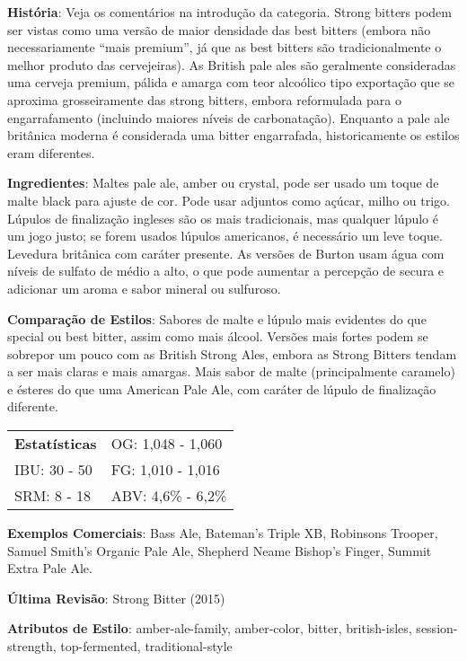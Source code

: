\textbf{História}: Veja os comentários na introdução da categoria. Strong bitters podem ser vistas como uma versão de maior densidade das best bitters (embora não necessariamente “mais premium”, já que as best bitters são tradicionalmente o melhor produto das cervejeiras). As British pale ales são geralmente consideradas uma cerveja premium, pálida e amarga com teor alcoólico tipo exportação que se aproxima grosseiramente das strong bitters, embora reformulada para o engarrafamento (incluindo maiores níveis de carbonatação). Enquanto a pale ale britânica moderna é considerada uma bitter engarrafada, historicamente os estilos eram diferentes.

\textbf{Ingredientes}: Maltes pale ale, amber ou crystal, pode ser usado um toque de malte black para ajuste de cor. Pode usar adjuntos como açúcar, milho ou trigo. Lúpulos de finalização ingleses são os mais tradicionais, mas qualquer lúpulo é um jogo justo; se forem usados lúpulos americanos, é necessário um leve toque. Levedura britânica com caráter presente. As versões de Burton usam água com níveis de sulfato de médio a alto, o que pode aumentar a percepção de secura e adicionar um aroma e sabor mineral ou sulfuroso.

\textbf{Comparação de Estilos}: Sabores de malte e lúpulo mais evidentes do que special ou best bitter, assim como mais álcool. Versões mais fortes podem se sobrepor um pouco com as British Strong Ales, embora as Strong Bitters tendam a ser mais claras e mais amargas. Mais sabor de malte (principalmente caramelo) e ésteres do que uma American Pale Ale, com caráter de lúpulo de finalização diferente.

\begin{tabular}{@{}p{35mm}p{35mm}@{}}
  \textbf{Estatísticas} & OG: 1,048 - 1,060 \\
  IBU: 30 - 50  & FG: 1,010 - 1,016  \\
  SRM: 8 - 18  & ABV: 4,6\% - 6,2\%
\end{tabular}

\textbf{Exemplos Comerciais}: Bass Ale, Bateman’s Triple XB, Robinsons Trooper, Samuel Smith’s Organic Pale Ale, Shepherd Neame Bishop's Finger, Summit Extra Pale Ale.

\textbf{Última Revisão}: Strong Bitter (2015)

\textbf{Atributos de Estilo}: amber-ale-family, amber-color, bitter, british-isles, session-strength, top-fermented, traditional-style